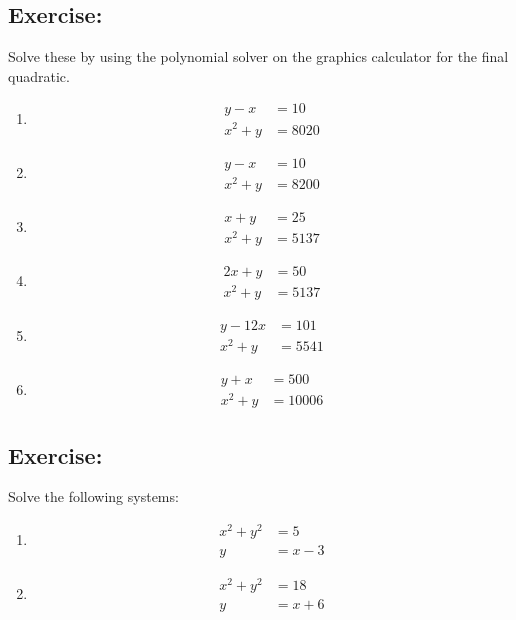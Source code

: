 \documentclass[a4paper,11pt]{article}
\begin{document}
\subsection{Exercise:}\label{ex2}
Solve these by using the polynomial solver on the graphics calculator for the final quadratic.
\begin{multicols}{3}
\begin{enumerate}
\item \begin{align*}
y-x&=10\\
x^{2}+y&=8020
\end{align*}
\item \begin{align*}
y-x&=10\\
x^{2}+y&=8200
\end{align*}
\item \begin{align*}
x+y&=25\\
x^{2}+y&=5137
\end{align*}
\item \begin{align*}
2x+y&=50\\
x^{2}+y&=5137
\end{align*}
\item \begin{align*}
y-12x&=101\\
x^{2}+y&=5541
\end{align*}
\item \begin{align*}
y+x&=500\\
x^{2}+y&=10006
\end{align*}
\end{enumerate}	
\end{multicols}
\subsection{Exercise:}\label{ex3}
Solve the following systems:
\begin{multicols}{2}
\begin{enumerate}
\item \begin{align*}
x^{2}+y^{2}&=5\\
y&=x-3
\end{align*}
\item \begin{align*}
x^{2}+y^{2}&=18\\
y&=x+6
\end{align*}
\end{enumerate}	
\end{multicols}
\end{document}
